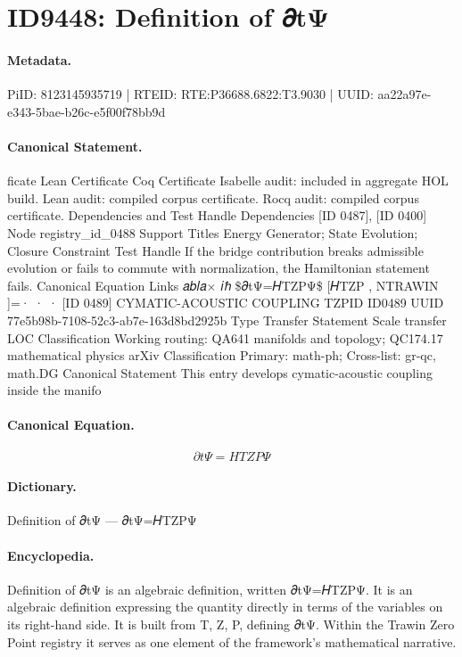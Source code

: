 \section*{ID9448: Definition of 𝜕tΨ}
\paragraph{Metadata.}
PiID: 8123145935719 | RTEID: RTE:P36688.6822:T3.9030 | UUID: aa22a97e-e343-5bae-b26c-e5f00f78bb9d

\paragraph{Canonical Statement.}
ficate Lean Certificate Coq Certificate Isabelle audit: included in aggregate HOL build. Lean audit: compiled corpus certificate. Rocq audit: compiled corpus certificate. Dependencies and Test Handle Dependencies [ID 0487], [ID 0400] Node registry\_id\_0488 Support Titles Energy Generator; State Evolution; Closure Constraint Test Handle If the bridge contribution breaks admissible evolution or fails to commute with normalization, the Hamiltonian statement fails. Canonical Equation Links 𝑎𝑏𝑙𝑎× 𝑖ℏ \$𝜕tΨ=𝐻TZPΨ\$ [𝐻TZP , NTRAWIN ]=· · · [ID 0489] CYMATIC-ACOUSTIC COUPLING TZPID ID0489 UUID 77e5b98b-7108-52c3-ab7e-163d8bd2925b Type Transfer Statement Scale transfer LOC Classification Working routing: QA641 manifolds and topology; QC174.17 mathematical physics arXiv Classification Primary: math-ph; Cross-list: gr-qc, math.DG Canonical Statement This entry develops cymatic-acoustic coupling inside the manifo

\paragraph{Canonical Equation.}
\[
𝜕tΨ=𝐻TZPΨ
\]

\paragraph{Dictionary.}
Definition of 𝜕tΨ — 𝜕tΨ=𝐻TZPΨ

\paragraph{Encyclopedia.}
Definition of 𝜕tΨ is an algebraic definition, written 𝜕tΨ=𝐻TZPΨ. It is an algebraic definition expressing the quantity directly in terms of the variables on its right-hand side. It is built from T, Z, P, defining 𝜕tΨ. Within the Trawin Zero Point registry it serves as one element of the framework's mathematical narrative.

